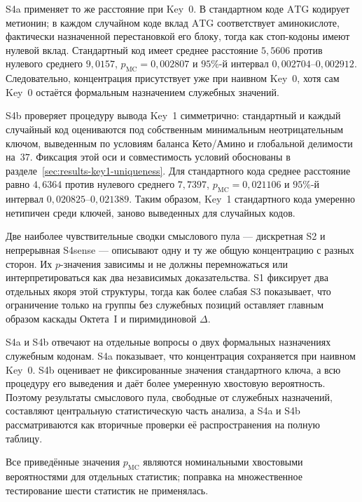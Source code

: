 \documentclass[11pt,a4paper]{article}
\renewcommand{\_}{\origunderscore\allowbreak}
\begin{document}
S4a применяет то же расстояние при Key~0. В стандартном коде
$\mathrm{ATG}$ кодирует метионин; в каждом случайном коде вклад
$\mathrm{ATG}$ соответствует аминокислоте, фактически назначенной
перестановкой его блоку, тогда как стоп-кодоны имеют нулевой
вклад. Стандартный код имеет среднее расстояние $5{,}5606$ против
нулевого среднего $9{,}0157$,
$p_{\mathrm{MC}} = 0{,}002807$ и $95\%$-й интервал
$0{,}002704$--$0{,}002912$. Следовательно, концентрация
присутствует уже при наивном Key~0, хотя сам Key~0 остаётся
формальным назначением служебных значений.

S4b проверяет процедуру вывода Key~1 симметрично: стандартный и
каждый случайный код оцениваются под собственным минимальным
неотрицательным ключом, выведенным по условиям баланса Кето/Амино
и глобальной делимости на~$37$. Фиксация этой оси и совместимость
условий обоснованы в разделе~\ref{sec:results-key1-uniqueness}.
Для стандартного кода среднее расстояние равно $4{,}6364$ против
нулевого среднего $7{,}7397$,
$p_{\mathrm{MC}} = 0{,}021106$ и $95\%$-й интервал
$0{,}020825$--$0{,}021389$. Таким образом, Key~1 стандартного
кода умеренно нетипичен среди ключей, заново выведенных для
случайных кодов.

Две наиболее чувствительные сводки смыслового пула --- дискретная
S2 и непрерывная S4sense --- описывают одну и ту же общую
концентрацию с разных сторон. Их $p$-значения зависимы и не должны
перемножаться или интерпретироваться как два независимых
доказательства. S1 фиксирует два отдельных якоря этой структуры,
тогда как более слабая S3 показывает, что ограничение только на
группы без служебных позиций оставляет главным образом каскады
Октета~I и пиримидиновой $\Delta$.

S4a и S4b отвечают на отдельные вопросы о двух формальных
назначениях служебным кодонам. S4a показывает, что концентрация
сохраняется при наивном Key~0. S4b оценивает не фиксированные
значения стандартного ключа, а всю процедуру его выведения и даёт
более умеренную хвостовую вероятность. Поэтому результаты
смыслового пула, свободные от служебных назначений, составляют
центральную статистическую часть анализа, а S4a и S4b
рассматриваются как вторичные проверки её распространения на
полную таблицу.

Все приведённые значения $p_{\mathrm{MC}}$ являются номинальными
хвостовыми вероятностями для отдельных статистик; поправка на
множественное тестирование шести статистик не применялась.
\end{document}
